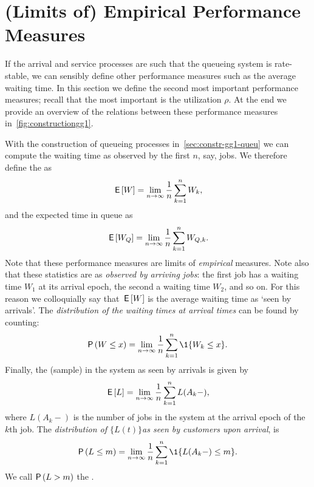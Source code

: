 \section{(Limits of) Empirical Performance Measures}
\label{sec:limits-of-emperical}




If the arrival and service processes are such that the queueing system is rate-stable, we can sensibly define other performance measures such as the average waiting time.
In this section we define the second most important performance measures; recall that the most important is the utilization $\rho$.
At the end we provide an overview of the relations between these performance measures in~\cref{fig:constructiongg1}.


With the construction of queueing processes in~\cref{sec:constr-gg1-queu} we can compute the waiting time as observed by the first $n$, say, jobs.
We therefore define the  as
\begin{equation}\label{eq:49}
  \,\mathsf{E}\left[W\right] = \lim_{n\to\infty} \frac 1n\sum_{k=1}^n W_k,
\end{equation}
and the expected time in queue as
\begin{equation}\label{eq:50}
  \,\mathsf{E}\left[W_Q\right] = \lim_{n\to\infty} \frac 1 n\sum_{k=1}^n W_{Q,k}.
\end{equation}
Note that these performance measures are limits of \emph{empirical} measures.
Note also that these statistics are as \emph{observed by arriving jobs}: the first job has a waiting time $W_1$ at its arrival epoch, the second a waiting time $W_2$, and so on.
For this reason we colloquially say that $\,\mathsf{E}\left[W\right]$ is the average waiting time as `seen by arrivals'.
The \emph{distribution of the waiting times at arrival times} can be found by counting:
\begin{equation}\label{eq:48}
  \P{W \leq x}  = \lim_{n\to\infty} \frac 1n\sum_{k=1}^n \1{W_k\leq x}.
\end{equation}
Finally, the (sample)  in the system as seen by arrivals is given by
\begin{equation}\label{eq:EQ}
\,\mathsf{E}\left[L\right] =  \lim_{n\to\infty}\frac 1 n \sum_{k=1}^n L(A_k-),
\end{equation}
where $L(A_k-)$ is the number of jobs in the system at the arrival epoch of the $k$th job.
The \emph{distribution of $\{L(t)\}$as seen by customers upon arrival}, is
\begin{equation}\label{eq:Qm}
\P{L\leq m} = \lim_{n\to\infty} \frac 1 n \sum_{k=1}^n \1{L(A_k-) \leq m}.
\end{equation}
We call $\P{L > m}$ the .



